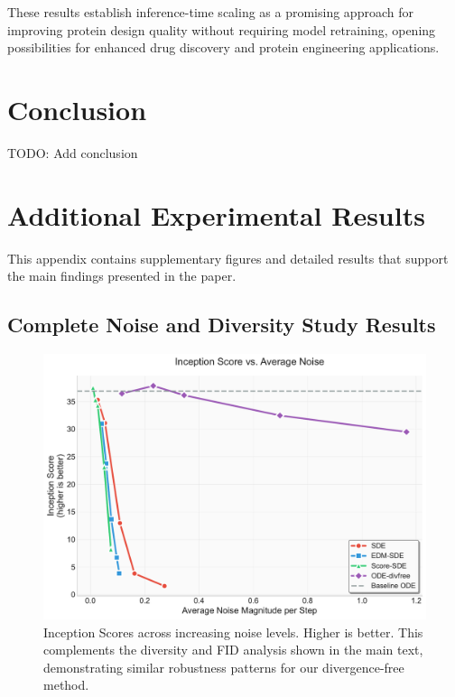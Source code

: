 \documentclass{article}
\begin{document}
These results establish inference-time scaling as a promising approach for improving protein design quality without requiring model retraining, opening possibilities for enhanced drug discovery and protein engineering applications.

\section{Conclusion}

TODO: Add conclusion





\appendix

\section{Additional Experimental Results}

This appendix contains supplementary figures and detailed results that support the main findings presented in the paper.

\subsection{Complete Noise and Diversity Study Results}

\begin{figure}[H]
  \centering
  \includegraphics[width=0.7\linewidth]{figures/noise_study_is.pdf}
  \caption{Inception Scores across increasing noise levels. Higher is better. This complements the diversity and FID analysis shown in the main text, demonstrating similar robustness patterns for our divergence-free method.}
  \label{fig:is-noise}
\end{figure}
\end{document}
